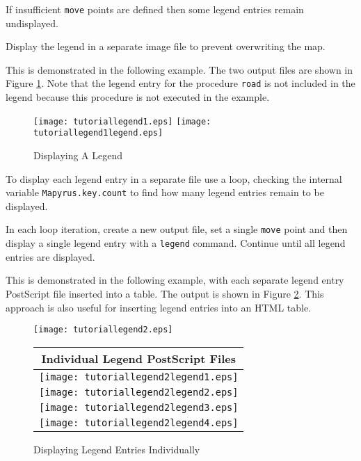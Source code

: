 If insufficient \texttt{move} points are defined then some legend entries
remain undisplayed.

Display the legend in a separate image file to prevent overwriting the map.

This is demonstrated in the following example.
The two output files are shown in Figure \ref{tutoriallegend1}.
Note that the legend entry for the procedure \texttt{road} is
not included in the legend because this procedure is not
executed in the example.



\begin{figure}[htb]
\texttt{[image: tutoriallegend1.eps]}
\texttt{[image: tutoriallegend1legend.eps]}
\caption{Displaying A Legend}
\label{tutoriallegend1}
\end{figure}

To display each legend entry in a separate file use a loop, checking the
internal variable \texttt{Mapyrus.key.count} to find how many legend entries
remain to be displayed.

In each loop iteration, create a new output file, set a single \texttt{move}
point and then display a single legend entry with a \texttt{legend} command.
Continue until all legend entries are displayed.

This is demonstrated in the following example, with each separate legend entry
PostScript file inserted into a table.  The output is shown in Figure
\ref{tutoriallegend2}.  This approach is also useful for inserting legend
entries into an HTML table.



\begin{figure}[htb]
\texttt{[image: tutoriallegend2.eps]}
\vspace{10pt}

\begin{tabular}{|c|}
\hline
Individual Legend PostScript Files \\
\hline
\texttt{[image: tutoriallegend2legend1.eps]} \\
\hline
\texttt{[image: tutoriallegend2legend2.eps]} \\
\hline
\texttt{[image: tutoriallegend2legend3.eps]} \\
\hline
\texttt{[image: tutoriallegend2legend4.eps]} \\
\hline
\end{tabular}

\caption{Displaying Legend Entries Individually}
\label{tutoriallegend2}
\end{figure}

